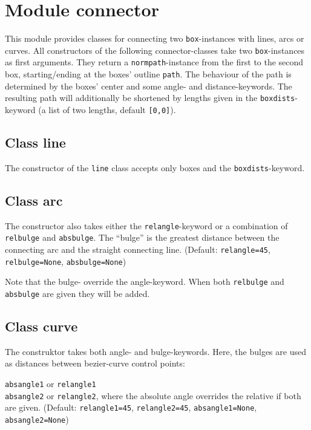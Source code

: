 \chapter{Module connector}
\label{connector}

This module provides classes for connecting two \verb|box|-instances with
lines, arcs or curves.
All constructors of the following connector-classes take two
\verb|box|-instances as first arguments. They return a
\verb|normpath|-instance from the first to the second box, starting/ending at
the boxes' outline \verb|path|. The behaviour of the path is determined by the
boxes' center and some angle- and distance-keywords. The resulting path will
additionally be shortened by lengths given in the \verb|boxdists|-keyword (a
list of two lengths, default \verb|[0,0]|).

\section{Class line}

The constructor of the \verb|line| class accepts only boxes and the
\verb|boxdists|-keyword.

\section{Class arc}

The constructor also takes either the \verb|relangle|-keyword or a combination
of \verb|relbulge| and \verb|absbulge|. The ``bulge'' is the greatest distance
between the connecting arc and the straight connecting line.
(Default: \verb|relangle=45|, \verb|relbulge=None|,
\verb|absbulge=None|)\medskip

Note that the bulge- override the angle-keyword. When both \verb|relbulge| and
\verb|absbulge| are given they will be added.

\section{Class curve}

The construktor takes both angle- and bulge-keywords. Here, the bulges are
used as distances between bezier-curve control points:\medskip

\verb|absangle1| or \verb|relangle1|\\
\verb|absangle2| or \verb|relangle2|, where the absolute angle overrides the
relative if both are given. (Default: \verb|relangle1=45|,
\verb|relangle2=45|, \verb|absangle1=None|, \verb|absangle2=None|)\medskip

